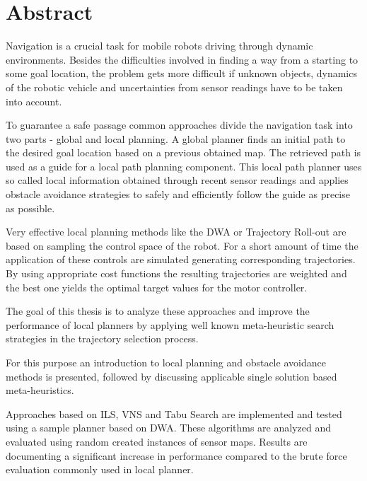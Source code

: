 \begingroup
\let\clearpage\relax
\let\cleardoublepage\relax
\let\cleardoublepage\relax

\chapter*{Abstract}
Navigation is a crucial task for mobile robots driving through dynamic environments.
Besides the difficulties involved in finding a way from a starting to some goal location, the problem gets more difficult if unknown objects, dynamics of the robotic vehicle and uncertainties from sensor readings have to be taken into account.

To guarantee a safe passage common approaches divide the navigation task into two parts - global and local planning.
A global planner finds an initial path to the desired goal location based on a previous obtained map. The retrieved path is used as a guide for a local path planning component.
This local path planner uses so called local information obtained through recent sensor readings and applies obstacle avoidance strategies to safely and efficiently follow the guide as precise as possible. 

Very effective local planning methods like the \ac{DWA} or Trajectory Roll-out are based on sampling the control space of the robot. For a short amount of time the application of these controls are simulated generating corresponding trajectories.
By using appropriate cost functions the resulting trajectories are weighted and the best one yields the optimal target values for the motor controller.

The goal of this thesis is to analyze these approaches and improve the performance of local planners by applying well known meta-heuristic search strategies in the trajectory selection process.

For this purpose an introduction to local planning and obstacle avoidance methods is presented,  followed by discussing applicable single solution based meta-heuristics. 

Approaches based on \ac{ILS}, \ac{VNS} and Tabu Search are implemented and tested using a sample planner based on \ac{DWA}. These algorithms are analyzed and evaluated using random created instances of sensor maps. Results are documenting a significant increase in performance compared to the brute force evaluation commonly used in local planner. 

